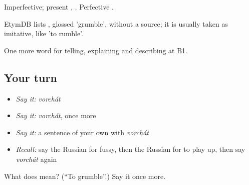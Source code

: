 Imperfective; present , . Perfective .

\begin{cousinweb}
EtymDB lists \emph{}, glossed 'grumble', without a source; it is usually taken as imitative, like \emph{} 'to rumble'.
\end{cousinweb}

\begin{grammarlens}[title={What you've built}]
One more word for telling, explaining and describing at B1.
\end{grammarlens}

\subsection*{Your turn}
\begin{itemize}
\raggedright
  \item \emph{Say it:} \emph{vorchát}
  \item \emph{Say it:} \emph{vorchát}, once more
  \item \emph{Say it:} a sentence of your own with \emph{vorchát}
  \item \emph{Recall:} say the Russian for fussy, then the Russian for to play up, then say \emph{vorchát} again
\end{itemize}

\begin{tcolorbox}[breakable,colback=teal!4,colframe=teal!35!black,title={Before you move on}]
What does  mean? (\textquotedblleft{}To grumble\textquotedblright{}.) Say it once more.
\end{tcolorbox}
